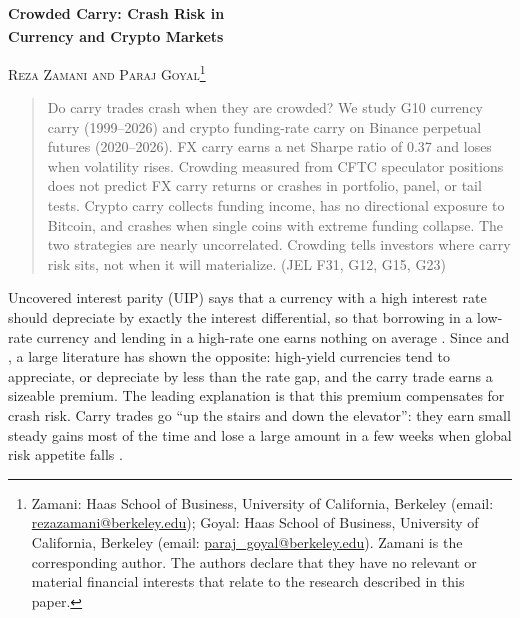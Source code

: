 \documentclass[11pt]{article}
\begin{document}
\begin{titlepage}
\begin{center}
{\LARGE\bfseries Crowded Carry: Crash Risk in\\[0.25em] Currency and Crypto Markets\textsuperscript{\normalfont\dag}\par}
\vspace{1.5em}
{\large \textsc{Reza Zamani and Paraj Goyal}\renewcommand{\thefootnote}{\fnsymbol{footnote}}\footnote[1]{\normalfont\small\upshape Zamani: Haas School of Business, University of California, Berkeley (email: \href{mailto:rezazamani@berkeley.edu}{rezazamani@berkeley.edu}); Goyal: Haas School of Business, University of California, Berkeley (email: \href{mailto:paraj_goyal@berkeley.edu}{paraj\_goyal@berkeley.edu}). Zamani is the corresponding author. The authors declare that they have no relevant or material financial interests that relate to the research described in this paper.}\par}
\end{center}

\vspace{2em}
\begin{quote}
\noindent
Do carry trades crash when they are crowded? We study G10 currency carry (1999--2026) and crypto funding-rate carry on Binance perpetual futures (2020--2026). FX carry earns a net Sharpe ratio of 0.37 and loses when volatility rises. Crowding measured from CFTC speculator positions does not predict FX carry returns or crashes in portfolio, panel, or tail tests. Crypto carry collects funding income, has no directional exposure to Bitcoin, and crashes when single coins with extreme funding collapse. The two strategies are nearly uncorrelated. Crowding tells investors where carry risk sits, not when it will materialize. (JEL F31, G12, G15, G23)
\end{quote}

\end{titlepage}

\setcounter{page}{1}

Uncovered interest parity (UIP) says that a currency with a high interest rate should depreciate by exactly the interest differential, so that borrowing in a low-rate currency and lending in a high-rate one earns nothing on average \citep{Engel1996}. Since \citet{HansenHodrick1980} and \citet{Fama1984}, a large literature has shown the opposite: high-yield currencies tend to appreciate, or depreciate by less than the rate gap, and the carry trade earns a sizeable premium. The leading explanation is that this premium compensates for crash risk. Carry trades go ``up the stairs and down the elevator'': they earn small steady gains most of the time and lose a large amount in a few weeks when global risk appetite falls \citep{BrunnermeierNagelPedersen2008, Menkhoff2012, Farhi2016}.
\end{document}
